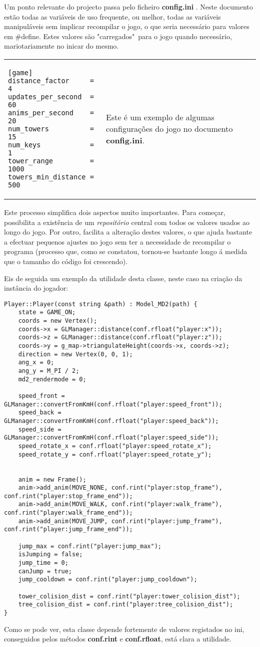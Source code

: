 

Um ponto relevante do projecto passa pelo ficheiro {\bf config.ini} . Neste documento estão todas as variáveis de uso frequente, ou melhor, todas as variáveis manipuláveis sem implicar recompilar o jogo, o que seria necessário para valores em \#define. Estes valores são "carregados"\ para o jogo quando necessário, mariotariamente no inicar do mesmo.

\-
\begin{center}
\begin{tabular} {l | p{10cm}}
\begin{lstlisting}
[game]
distance_factor		= 4
updates_per_second	= 60
anims_per_second	= 20
num_towers			= 15
num_keys			= 1
tower_range			= 1000
towers_min_distance = 500
\end{lstlisting} 
& 
Este é um exemplo de algumas configurações do jogo no documento {\bf config.ini}. \\
\end{tabular}
\end{center}

Este processo simplifica dois aspectos muito importantes. Para começar, possibilita a existência de um \emph{repositório} central com todos os valores usados ao longo do jogo. Por outro, facilita a alteração destes valores, o que ajuda bastante a efectuar pequenos ajustes no jogo sem ter a necessidade de recompilar o programa (processo que, como se constatou, tornou-se bastante longo á medida que o tamanho do código foi crescendo).

Eis de seguida um exemplo da utilidade desta classe, neste caso na criação da instância do jogador:

\begin{lstlisting}[caption=Construtor do jogador]
Player::Player(const string &path) : Model_MD2(path) {
	state = GAME_ON;
	coords = new Vertex();
	coords->x = GLManager::distance(conf.rfloat("player:x"));
	coords->z = GLManager::distance(conf.rfloat("player:z"));
	coords->y = g_map->triangulateHeight(coords->x, coords->z);
	direction = new Vertex(0, 0, 1);
	ang_x = 0;
	ang_y = M_PI / 2;
	md2_rendermode = 0;

	speed_front = GLManager::convertFromKmH(conf.rfloat("player:speed_front"));
	speed_back = GLManager::convertFromKmH(conf.rfloat("player:speed_back"));
	speed_side = GLManager::convertFromKmH(conf.rfloat("player:speed_side"));
	speed_rotate_x = conf.rfloat("player:speed_rotate_x");
	speed_rotate_y = conf.rfloat("player:speed_rotate_y");


	anim = new Frame();
	anim->add_anim(MOVE_NONE, conf.rint("player:stop_frame"), conf.rint("player:stop_frame_end"));
	anim->add_anim(MOVE_WALK, conf.rint("player:walk_frame"), conf.rint("player:walk_frame_end"));
	anim->add_anim(MOVE_JUMP, conf.rint("player:jump_frame"), conf.rint("player:jump_frame_end"));

	jump_max = conf.rint("player:jump_max");
	isJumping = false;
	jump_time = 0;
	canJump = true;
	jump_cooldown = conf.rint("player:jump_cooldown");

	tower_colision_dist = conf.rint("player:tower_colision_dist");
	tree_colision_dist = conf.rint("player:tree_colision_dist");
}
\end{lstlisting}

Como se pode ver, esta classe depende fortemente de valores registados no ini, conseguidos pelos métodos \textbf{conf.rint} e \textbf{conf.rfloat}, está clara a utilidade.
